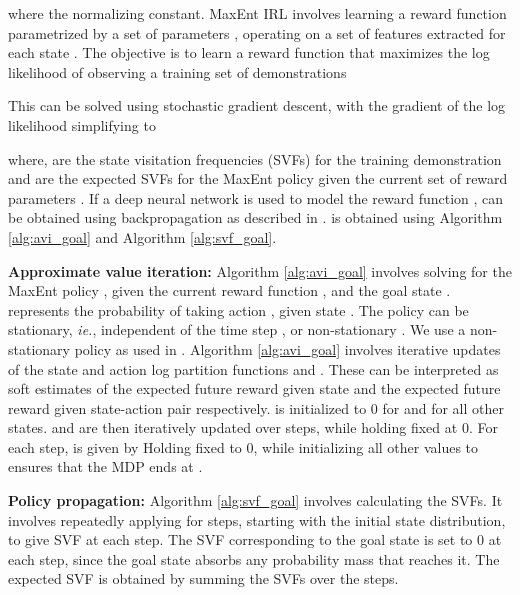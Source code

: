\documentclass[journal]{IEEEtran}
\begin{document}
where  the normalizing constant. MaxEnt IRL involves learning a reward function  parametrized by a set of parameters , operating on a set of features extracted for each state . The objective is to learn a reward function that maximizes the log likelihood of observing a training set of demonstrations  


This can be solved using stochastic gradient descent, with the gradient of the log likelihood  simplifying to

where,  are the state visitation frequencies (SVFs) for the training demonstration  and  are the expected SVFs for the MaxEnt policy given the current set of reward parameters . If a deep neural network is used to model the reward function ,  can be obtained using backpropagation as described in \cite{wulfmeier2015maximum}.  is obtained using Algorithm \ref{alg:avi_goal} and Algorithm \ref{alg:svf_goal}.






\vspace{0.1in}
\noindent\textbf{Approximate value iteration:} Algorithm \ref{alg:avi_goal} involves solving for the MaxEnt policy , given the current reward function , and the goal state .  represents the probability of taking action , given state . The policy can be stationary, \textit{ie.}, independent of the time step , or non-stationary . We use a non-stationary policy as used in \cite{ziebart2010modeling, levine2018reinforcement}. Algorithm \ref{alg:avi_goal} involves iterative updates of the state and action log partition functions  and . These can be interpreted as soft estimates of the expected future reward given state  and the expected future reward given state-action pair  respectively.  is initialized to 0 for  and   for all other states.  and  are then iteratively updated over  steps, while holding  fixed at 0. For each step,  is given by  Holding  fixed to 0, while initializing all other  values to  ensures that the MDP ends at . 




\vspace{0.1in}
\noindent \textbf{Policy propagation:} Algorithm \ref{alg:svf_goal} involves calculating the SVFs. It involves repeatedly applying  for  steps, starting with the initial state distribution, to give SVF at each step. The SVF corresponding to the goal state is set to 0 at each step, since the goal state absorbs any probability mass that reaches it. The expected SVF  is obtained by summing the SVFs over the  steps.
\end{document}
